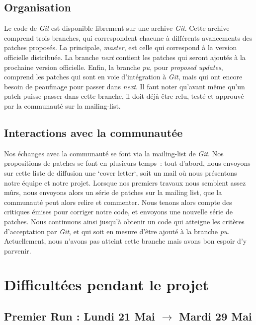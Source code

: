 \documentclass[11pt]{article}
\begin{document}
\subsection{Organisation}

Le code de \textit{Git} est disponible librement sur une archive
\textit{Git}. Cette archive comprend trois branches, qui correspondent
chacune à différents avancements des patches proposés. La principale,
\textit{master}, est celle qui correspond à la version officielle
distribuée. La branche \textit{next} contient les patches qui seront
ajoutés à la prochaine version officielle. Enfin, la branche
\textit{pu}, pour \textit{proposed updates}, comprend les patches qui
sont en voie d'intégration à \textit{Git}, mais qui ont encore besoin
de peaufinage pour passer dans \textit{next}. Il faut noter qu'avant
même qu'un patch puisse passer dans cette branche, il doit déjà être
relu, testé et approuvé par la communauté sur la mailing-list.

\subsection{Interactions avec la communautée}

Nos échanges avec la communauté se font via la mailing-list de
\textit{Git}. Nos propositions de patches se font en plusieurs temps~:
tout d'abord, nous envoyons sur cette liste de diffusion une `cover
letter`, soit un mail où nous présentons notre équipe et notre
projet. Lorsque nos premiers travaux nous semblent assez mûrs, nous
envoyons alors un série de patches sur la mailing list, que la
communauté peut alors relire et commenter. Nous tenons alors compte
des critiques émises pour corriger notre code, et envoyons une
nouvelle série de patches. Nous continuons ainsi jusqu'à obtenir un
code qui atteigne les critères d'acceptation par \textit{Git}, et qui
soit en mesure d'être ajouté à la branche \textit{pu}.
Actuellement, nous n'avons pas atteint cette branche mais avons bon
espoir d'y parvenir.

\section{Difficultées pendant le projet}

\subsection{Premier Run : Lundi 21 Mai $\rightarrow$ Mardi 29 Mai}
\end{document}

